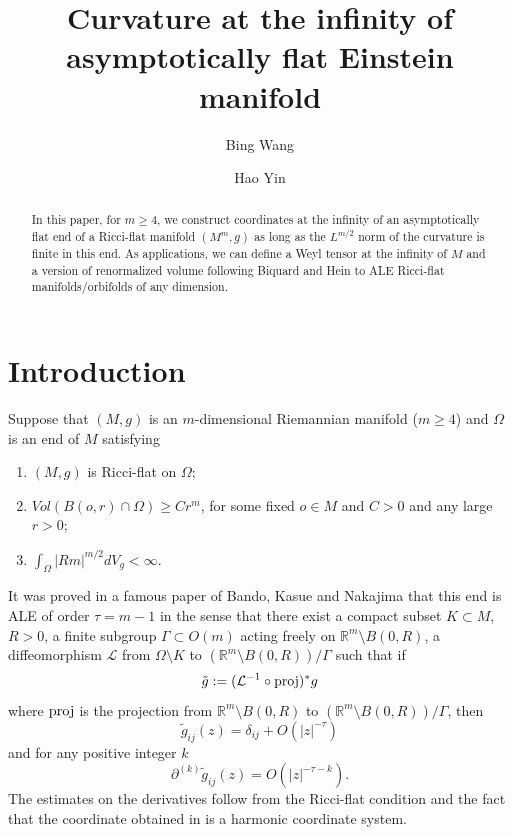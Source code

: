 \documentclass{amsart}
\newcommand{\abs}[1]{\left\vert#1\right\vert}
\newcommand{\Real}{\mathbb R}
\numberwithin{equation}{section}
\begin{document}
\title{Curvature at the infinity of asymptotically flat Einstein manifold}

\author{Bing Wang}
\author{Hao Yin}

\address{Bing Wang,  Institute of Geometry and Physics, and School of Mathematical Sciences,
University of Science and Technology of China, Hefei 230026, China;
Hefei National Laboratory, Hefei 230088, China}
\address{Hao Yin,  School of Mathematical Sciences,
University of Science and Technology of China, Hefei 230026, China}

\begin{abstract}
	In this paper, for $m\geq4$, we construct coordinates at the infinity of an asymptotically flat end of a Ricci-flat manifold $(M^m,g)$ as long as the $L^{m/2}$ norm of the curvature is finite in this end. As applications, we can define a Weyl tensor at the infinity of $M$ and a version of renormalized volume following Biquard and Hein to ALE Ricci-flat manifolds/orbifolds of any dimension.
\end{abstract}


\maketitle
\section{Introduction}
\label{sec:intro}

Suppose that $(M,g)$ is an $m$-dimensional Riemannian manifold ($m\geq 4$) and $\Omega$ is an end of $M$ satisfying
\begin{enumerate}
	\item $(M,g)$ is Ricci-flat on $\Omega$;
	\item $Vol(B(o,r)\cap \Omega)\geq C r^m$, for some fixed $o\in M$ and $C>0$ and any large $r>0$;
	\item $\int_\Omega \abs{Rm}^{m/2} dV_g<\infty $.
\end{enumerate}
It was proved in a famous paper of Bando, Kasue and Nakajima \cite{bando1989on} that this end is ALE of order $\tau=m-1$ in the sense that there exist a compact subset $K\subset M$, $R>0$, a finite subgroup $\Gamma\subset O(m)$ acting freely on $\Real^m \setminus B(0,R)$, a diffeomorphism $\mathcal L$ from $\Omega\setminus K$ to $(\Real^m \setminus B(0,R))/\Gamma$ such that if
\[
	\tilde{g}:= (\mathcal L^{-1}\circ {\rm proj})^* g
\]
where ${\rm proj}$ is the projection from $\Real^m\setminus B(0,R)$ to $(\Real^m\setminus B(0,R))/\Gamma$, then
\[
	\tilde{g}_{ij}(z)= \delta_{ij} + O(\abs{z}^{-\tau})
\]
and for any positive integer $k$
\begin{equation}
	\label{eqn:der}
	\partial^{(k)} \tilde{g}_{ij}(z)=O(\abs{z}^{-\tau-k}).
\end{equation}
The estimates on the derivatives follow from the Ricci-flat condition and the fact that the coordinate obtained in \cite{bando1989on} is a harmonic coordinate system. 
\end{document}
